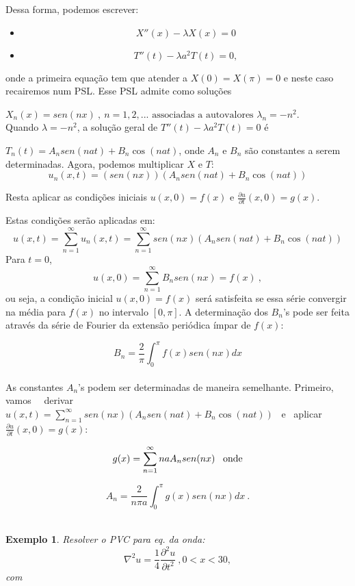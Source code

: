 \documentclass[a4paper,portuguese,9pt,final]{extarticle}
\newtheorem{example}{Exemplo}[section]
\providecommand{\sin}{} \renewcommand{\sin}{sen}
\begin{document}
\begin{multicols*}{2}
            Dessa forma, podemos escrever:
            \begin{itemize}
                \item[]$$X''(x)-\lambda X(x) = 0$$
                \item[]$$ T''(t) - \lambda a^{2} T(t) =0,$$
            \end{itemize}
            onde a primeira equação tem que atender a $ X(0)=X(\pi)=0 $ e neste caso recairemos num PSL. Esse PSL admite como soluções

            $X_{n}(x)=sen(nx) \ , \ n=1,2,... \mbox{ \ \ associadas a autovalores \ } \lambda_{n}=-n^{2}$.\\

            Quando $\lambda=-n^{2}$, a solução geral de $ T''(t) - \lambda a^{2} T(t) =0 $ é 

            $T_{n}(t)=A_{n}\sin(nat)+B_{n}\cos(nat)$, onde $ A_{n} $ e $ B_{n} $ são constantes a serem determinadas. Agora, podemos multiplicar $ X $ e $ T $:
            $$  u_{n}(x,t)=(\sin(nx))(A_{n}\sin(nat)+B_{n}\cos(nat))  $$

            Resta aplicar as condições iniciais $ u(x,0)=f(x) $ e  $ \frac{\partial u}{\partial t}(x,0)=g(x) $.

            Estas condições serão aplicadas em:
            $$  u(x,t)=\sum_{n=1}^{\infty} u_{n}(x,t) = \sum_{n=1}^{\infty} \sin(nx)(A_{n}\sin(nat)+B_{n}\cos(nat))$$
            Para $t=0$,
            $$  u(x,0)=\sum_{n=1}^{\infty} B_{n}\sin(nx)=f(x)  \ ,  $$
            ou seja, a condição inicial $ u(x,0)=f(x) $ será satisfeita se essa série convergir na média para $ f(x) $ no intervalo $ [0,\pi] $. A determinação dos $ B_{n} $'s pode ser feita através da série de Fourier da extensão periódica ímpar de $ f(x) $:

            $$  B_{n}=\frac{2}{\pi}\int_{0}^{\pi}f(x)\sin(nx)dx  $$\\

            As constantes $ A_{n} $'s podem ser determinadas de maneira semelhante. Primeiro, vamos \ \ derivar \ \  $\displaystyle u(x,t)=\sum_{n=1}^{\infty}\sin(nx)(A_{n}\sin(nat)+B_{n}\cos(nat)) $ \  e \  aplicar \   $ \frac{\partial u}{\partial t}(x,0)=g(x) $:

            $$  g(x)=\sum_{n=1}^{\infty}naA_{n}\sin(nx) \mbox{ \, onde} $$

            $$  A_{n}=\frac{2}{n\pi a} \int_{0}^{\pi}g(x)\sin(nx)dx \ . $$\\

            \begin{example}	
                \setlength{\jot}{10pt}
                Resolver o PVC para eq. da onda:
                    $$\nabla^{2} u=\frac{1}{4}\frac{\partial^{2}u }{\partial t^{2}} \ , 0<x<30,$$ com 


\end{example}
\end{multicols*}
\end{document}
